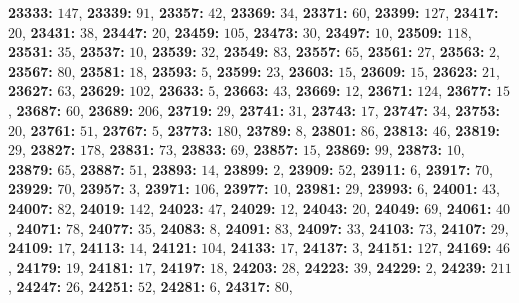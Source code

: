 \textsf{\bfseries 23333:} $147$, \textsf{\bfseries 23339:} $91$, \textsf{\bfseries 23357:} $42$, \textsf{\bfseries 23369:} $34$, \textsf{\bfseries 23371:} $60$, \textsf{\bfseries 23399:} $127$, \textsf{\bfseries 23417:} $20$, \textsf{\bfseries 23431:} $38$, \textsf{\bfseries 23447:} $20$, \textsf{\bfseries 23459:} $105$, \textsf{\bfseries 23473:} $30$, \textsf{\bfseries 23497:} $10$, \textsf{\bfseries 23509:} $118$, \textsf{\bfseries 23531:} $35$, \textsf{\bfseries 23537:} $10$, \textsf{\bfseries 23539:} $32$, \textsf{\bfseries 23549:} $83$, \textsf{\bfseries 23557:} $65$, \textsf{\bfseries 23561:} $27$, \textsf{\bfseries 23563:} $2$, \textsf{\bfseries 23567:} $80$, \textsf{\bfseries 23581:} $18$, \textsf{\bfseries 23593:} $5$, \textsf{\bfseries 23599:} $23$, \textsf{\bfseries 23603:} $15$, \textsf{\bfseries 23609:} $15$, \textsf{\bfseries 23623:} $21$, \textsf{\bfseries 23627:} $63$, \textsf{\bfseries 23629:} $102$, \textsf{\bfseries 23633:} $5$, \textsf{\bfseries 23663:} $43$, \textsf{\bfseries 23669:} $12$, \textsf{\bfseries 23671:} $124$, \textsf{\bfseries 23677:} $15$, \textsf{\bfseries 23687:} $60$, \textsf{\bfseries 23689:} $206$, \textsf{\bfseries 23719:} $29$, \textsf{\bfseries 23741:} $31$, \textsf{\bfseries 23743:} $17$, \textsf{\bfseries 23747:} $34$, \textsf{\bfseries 23753:} $20$, \textsf{\bfseries 23761:} $51$, \textsf{\bfseries 23767:} $5$, \textsf{\bfseries 23773:} $180$, \textsf{\bfseries 23789:} $8$, \textsf{\bfseries 23801:} $86$, \textsf{\bfseries 23813:} $46$, \textsf{\bfseries 23819:} $29$, \textsf{\bfseries 23827:} $178$, \textsf{\bfseries 23831:} $73$, \textsf{\bfseries 23833:} $69$, \textsf{\bfseries 23857:} $15$, \textsf{\bfseries 23869:} $99$, \textsf{\bfseries 23873:} $10$, \textsf{\bfseries 23879:} $65$, \textsf{\bfseries 23887:} $51$, \textsf{\bfseries 23893:} $14$, \textsf{\bfseries 23899:} $2$, \textsf{\bfseries 23909:} $52$, \textsf{\bfseries 23911:} $6$, \textsf{\bfseries 23917:} $70$, \textsf{\bfseries 23929:} $70$, \textsf{\bfseries 23957:} $3$, \textsf{\bfseries 23971:} $106$, \textsf{\bfseries 23977:} $10$, \textsf{\bfseries 23981:} $29$, \textsf{\bfseries 23993:} $6$, \textsf{\bfseries 24001:} $43$, \textsf{\bfseries 24007:} $82$, \textsf{\bfseries 24019:} $142$, \textsf{\bfseries 24023:} $47$, \textsf{\bfseries 24029:} $12$, \textsf{\bfseries 24043:} $20$, \textsf{\bfseries 24049:} $69$, \textsf{\bfseries 24061:} $40$, \textsf{\bfseries 24071:} $78$, \textsf{\bfseries 24077:} $35$, \textsf{\bfseries 24083:} $8$, \textsf{\bfseries 24091:} $83$, \textsf{\bfseries 24097:} $33$, \textsf{\bfseries 24103:} $73$, \textsf{\bfseries 24107:} $29$, \textsf{\bfseries 24109:} $17$, \textsf{\bfseries 24113:} $14$, \textsf{\bfseries 24121:} $104$, \textsf{\bfseries 24133:} $17$, \textsf{\bfseries 24137:} $3$, \textsf{\bfseries 24151:} $127$, \textsf{\bfseries 24169:} $46$, \textsf{\bfseries 24179:} $19$, \textsf{\bfseries 24181:} $17$, \textsf{\bfseries 24197:} $18$, \textsf{\bfseries 24203:} $28$, \textsf{\bfseries 24223:} $39$, \textsf{\bfseries 24229:} $2$, \textsf{\bfseries 24239:} $211$, \textsf{\bfseries 24247:} $26$, \textsf{\bfseries 24251:} $52$, \textsf{\bfseries 24281:} $6$, \textsf{\bfseries 24317:} $80$, 

